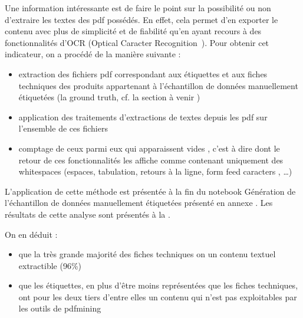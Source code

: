             Une information intéressante est de faire le point sur la possibilité ou non d'extraire les textes des pdf possédés.
            En effet, cela permet d'en exporter le contenu avec plus de simplicité et de fiabilité qu'en ayant recours à des fonctionnalités d'OCR (Optical Caracter Recognition~\cite{OCR_wiki}).
            Pour obtenir cet indicateur, on a procédé de la manière suivante : 
            \begin{itemize}
                \item extraction des fichiers pdf correspondant aux étiquettes et aux fiches techniques des produits appartenant à l'échantillon de données manuellement étiquetées (la ground truth, cf. la section à venir )
                \item application des traitements d'extractions de textes depuis les pdf sur l'ensemble de ces fichiers
                \item comptage de ceux parmi eux qui apparaissent \og vides \fg, c'est à dire dont le retour de ces fonctionnalités les affiche comme contenant uniquement des whitespaces (espaces, tabulation, retours à la ligne, \og form feed caracters \fg, \dots)
            \end{itemize}
            L'application de cette méthode est présentée à la fin du notebook \og Génération de l'échantillon de données manuellement étiquetées \fg présenté en annexe .
            Les résultats de cette analyse sont présentés à la .
            
            On en déduit :
            ~\begin{itemize}
                \item que la très grande majorité des fiches techniques on un contenu textuel extractible (96\%)
                \item que les étiquettes, en plus d'être moins représentées que les fiches techniques, ont pour les deux tiers d'entre elles un contenu qui n'est pas exploitables par les outils de pdfmining
            \end{itemize}
